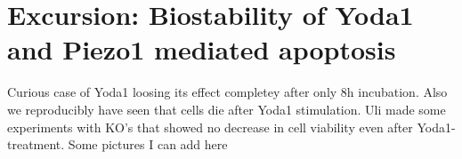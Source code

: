 \section{Excursion: Biostability of Yoda1 and Piezo1 mediated apoptosis}
\label{sec:biostability}
Curious case of Yoda1 loosing its effect completey after only 8h incubation. Also we reproducibly have seen that cells die after Yoda1 stimulation. Uli made some experiments with KO's that showed no decrease in cell viability even after Yoda1-treatment. Some pictures I can add here